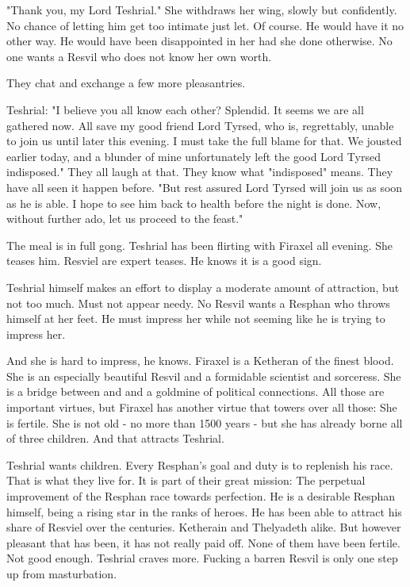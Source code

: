 "Thank you, my Lord Teshrial."
She withdraws her wing, slowly but confidently. 
No chance of letting him get too intimate just let. 
Of course. 
He would have it no other way. 
He would have been disappointed in her had she done otherwise. 
No one wants a Resvil who does not know her own worth. 

They chat and exchange a few more pleasantries. 

Teshrial: 
"I believe you all know each other? 
 Splendid. 
 It seems we are all gathered now.
 All save my good friend Lord Tyrsed, who is, regrettably, unable to join us until later this evening. 
 I must take the full blame for that. 
 We jousted earlier today, and a blunder of mine unfortunately left the good Lord Tyrsed indisposed."
They all laugh at that.
They know what "indisposed" means. 
They have all seen it happen before. 
"But rest assured Lord Tyrsed will join us as soon as he is able.
 I hope to see him back to health before the night is done.
 Now, without further ado, let us proceed to the feast."









\begin{comment}
\subsection{Teshrial's battle}
\end{comment}
\new
The meal is in full gong. 
Teshrial has been flirting with Firaxel all evening.
She teases him. 
Resviel are expert teases. 
He knows it is a good sign. 

Teshrial himself makes an effort to display a moderate amount of attraction, but not too much. 
Must not appear needy. 
No Resvil wants a Resphan who throws himself at her feet. 
He must impress her while not seeming like he is trying to impress her. 

And she is hard to impress, he knows. 
Firaxel is a Ketheran of the finest blood. 
She is an especially beautiful Resvil and a formidable scientist and sorceress. 
She is a bridge between \CiriathSepher and \TiphredSerah and a goldmine of political connections. 
All those are important virtues, but Firaxel has another virtue that towers over all those: 
She is fertile. 
She is not old - no more than 1500 years - but she has already borne all of three children. 
And that attracts Teshrial. 

Teshrial wants children. 
Every Resphan's goal and duty is to replenish his race. 
That is what they live for. 
It is part of their great mission: 
The perpetual improvement of the Resphan race towards perfection. 
He is a desirable Resphan himself, being a rising star in the ranks of \CiriathSepher heroes. 
He has been able to attract his share of Resviel over the centuries. 
Ketherain and Thelyadeth alike. 
But however pleasant that has been, it has not really paid off. 
None of them have been fertile. 
Not good enough. 
Teshrial craves more. 
Fucking a barren Resvil is only one step up from masturbation. 

